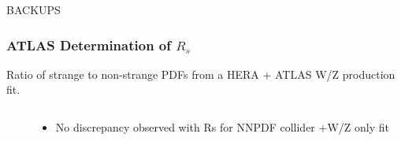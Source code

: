 \documentclass[10pt]{beamer}
\begin{document}
\begin{frame}
    \begin{center}
      BACKUPS
    \end{center}
\end{frame}

\begin{frame}
\frametitle{ATLAS Determination of $R_s$}
\begin{centering}
\small Ratio of strange to non-strange PDFs from a HERA + ATLAS W/Z production fit.\\
\end{centering}
\begin{columns}
  \begin{column}{0.5\textwidth}
  \end{column}
    \begin{column}{0.5\textwidth}
       \begin{itemize}
		\item<1-> No discrepancy observed with Rs for NNPDF collider +W/Z only fit
\end{itemize}
   \end{column}
  \end{columns}
\end{frame}
\end{document}
